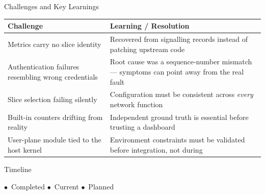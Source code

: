 \documentclass[aspectratio=169,11pt]{beamer}
\begin{document}
\begin{frame}{Challenges and Key Learnings}
  \small
  \renewcommand{\arraystretch}{1.3}
  \begin{tabular}{@{}p{}p{}@{}}
    \toprule
    \textbf{Challenge} & \textbf{Learning / Resolution}\\
    \midrule
    Metrics carry no slice identity
      & Recovered from signalling records instead of patching upstream code\\
    Authentication failures resembling wrong credentials
      & Root cause was a sequence-number mismatch --- symptoms can point away from the real fault\\
    Slice selection failing silently
      & Configuration must be consistent across \emph{every} network function\\
    Built-in counters drifting from reality
      & Independent ground truth is essential before trusting a dashboard\\
    User-plane module tied to the host kernel
      & Environment constraints must be validated before integration, not during\\
    \bottomrule
  \end{tabular}
\end{frame}

\begin{frame}{Timeline}
  \begin{center}
  \end{center}
  \vfill
  \begin{center}
    \footnotesize
    {\color{okGreen}$\bullet$}~Completed \quad
    {\color{brandAccent}$\bullet$}~Current \quad
    {\color{softGrey}$\bullet$}~Planned
  \end{center}
\end{frame}
\end{document}
